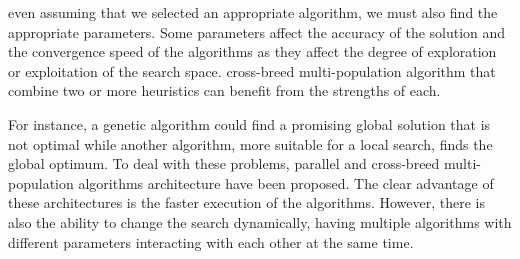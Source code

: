 \documentclass[runningheads]{llncs}
\begin{document}
even assuming that we selected an appropriate algorithm, we must also find the
appropriate parameters.  Some parameters affect the accuracy of the solution and
the convergence speed of the algorithms as they affect the degree of exploration
or exploitation of the search space.  cross-breed multi-population algorithm that combine two or more
heuristics can benefit from the strengths of each. %

For instance, a genetic
algorithm could find a promising global solution that is not optimal while another algorithm, more
suitable for a local search, finds the global optimum. To deal with these problems,
parallel and cross-breed multi-population algorithms architecture have been proposed. %
The clear advantage of
these architectures is the faster execution of the algorithms. However, there is
also the ability to change the search dynamically, %
having multiple algorithms
with different parameters interacting with each other at the same
time. %
\end{document}
